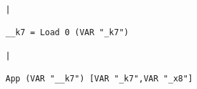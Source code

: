 \begin{landscape}
\begin{lstlisting}[basicstyle=\fontsize{6.5}{7.5}\selectfont\ttfamily]
                                                                                                                                            |
                                                                                                                                __k7 = Load 0 (VAR "_k7")
                                                                                                                                            |
                                                                                                                          App (VAR "__k7") [VAR "_k7",VAR "_x8"]

\end{lstlisting}
\end{landscape}
\clearpage